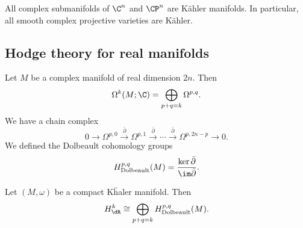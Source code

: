 \documentclass[a4paper]{article}
\newcommand\Dolb{\mathrm{Dolbeault}}
\begin{document}
\begin{eg}
  All complex submanifolds of $\C^n$ and $\CP^n$ are K\"ahler manifolds. In particular, all smooth complex projective varieties are K\"ahler.
\end{eg}


\subsection{Hodge theory for real manifolds}
Let $M$ be a complex manifold of real dimension $2n$. Then
\[
  \Omega^k(M; \C) = \bigoplus_{p + q = k} \Omega^{p, q}.
\]
We have a chain complex
\[
  0 \to \Omega^{p, 0} \overset{\bar{\partial}}{\to} \Omega^{p, 1} \overset{\bar{\partial}}{\to} \cdots \overset{\bar{\partial}}{\to} \Omega^{p, 2n - p} \to 0.
\]
We defined the Dolbeault cohomology groups
\[
  H_{\Dolb}^{p, q}(M) = \frac{\ker \bar{\partial}}{\im \bar{\partial}}.
\]
\begin{thm}
  Let $(M, \omega)$ be a compact K\"haler manifold. Then
  \[
    H^k_{\dR} \cong \bigoplus_{p + q = k} H^{p, q}_{\Dolb}(M).
  \]
\end{thm}
\end{document}
